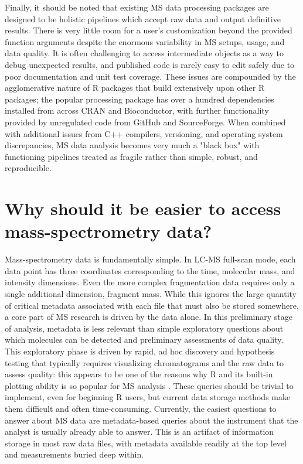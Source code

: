 Finally, it should be noted that existing MS data processing packages are designed to be holistic pipelines which accept raw data and output definitive results. There is very little room for a user's customization beyond the provided function arguments despite the enormous variability in MS setups, usage, and data quality. It is often challenging to access intermediate objects as a way to debug unexpected results, and published code is rarely easy to edit safely due to poor documentation and unit test coverage. These issues are compounded by the agglomerative nature of R packages that build extensively upon other R packages; the popular  processing package has over a hundred dependencies installed from across CRAN and Bioconductor, with further functionality provided by unregulated code from GitHub and SourceForge. When combined with additional issues from C++ compilers, versioning, and operating system discrepancies, MS data analysis becomes very much a "black box" with functioning pipelines treated as fragile rather than simple, robust, and reproducible.

\section{Why should it be easier to access mass-spectrometry data?}

Mass-spectrometry data is fundamentally simple. In LC-MS full-scan mode, each data point has three coordinates corresponding to the time, molecular mass, and intensity dimensions. Even the more complex fragmentation data requires only a single additional dimension, fragment mass. While this ignores the large quantity of critical metadata associated with each file that must also be stored somewhere, a core part of MS research is driven by the data alone. In this preliminary stage of analysis, metadata is less relevant than simple exploratory questions about which molecules can be detected and preliminary assessments of data quality. This exploratory phase is driven by rapid, ad hoc discovery and hypothesis testing that typically requires visualizing chromatograms and the raw data to assess quality: this appears to be one of the reasons why R and its built-in plotting ability is so popular for MS analysis \citep{gatto2015}. These queries should be trivial to implement, even for beginning R users, but current data storage methods make them difficult and often time-consuming. Currently, the easiest questions to answer about MS data are metadata-based queries about the instrument that the analyst is usually already able to answer. This is an artifact of information storage in most raw data files, with metadata available readily at the top level and measurements buried deep within.

